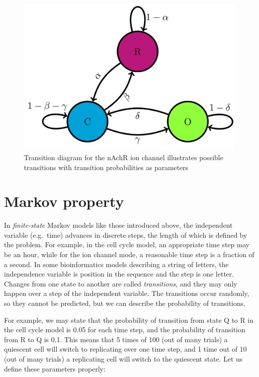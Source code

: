 \documentclass[
  letterpaper,
  DIV=11,
  numbers=noendperiod]{scrreprt}
\begin{document}
\begin{figure}

{\centering \includegraphics{./ch10/channel_trans_diag.png}

}

\caption{Transition diagram for the nAchR ion channel illustrates
possible transitions with transition probabilities as parameters}

\end{figure}

\hypertarget{markov-property}{%
\section{Markov property}\label{markov-property}}

\label{sec:math10}

In \emph{finite-state} Markov models like those introduced above, the
independent variable (e.g.~time) advances in discrete steps, the length
of which is defined by the problem. For example, in the cell cycle
model, an appropriate time step may be an hour, while for the ion
channel mode, a reasonable time step is a fraction of a second. In some
bioinformatics models describing a string of letters, the independence
variable is position in the sequence and the step is one letter. Changes
from one state to another are called \emph{transitions}, and they may
only happen over a step of the independent variable. The transitions
occur randomly, so they cannot be predicted, but we can describe the
probability of transitions.

For example, we may state that the probability of transition from state
Q to R in the cell cycle model is 0.05 for each time step, and the
probability of transition from R to Q is 0.1. This means that 5 times of
100 (out of many trials) a quiescent cell will switch to replicating
over one time step, and 1 time out of 10 (out of many trials) a
replicating cell will switch to the quiescent state. Let us define these
parameters properly:
\end{document}
